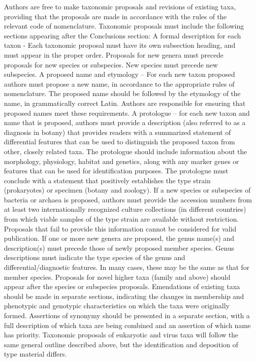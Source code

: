 \documentclass{bmcart}
\begin{document}
Authors are free to make taxonomic proposals and revisions of existing taxa, providing that the proposals are made in accordance with the rules of the relevant code of nomenclature. Taxonomic proposals must include the following sections appearing after the Conclusions section: A formal description for each taxon - Each taxonomic proposal must have its own subsection heading, and must appear in the proper order. Proposals for new genera must precede proposals for new species or subspecies. New species must precede new subspecies. A proposed name and etymology – For each new taxon proposed authors must propose a new name, in accordance to the appropriate rules of nomenclature. The proposed name should be followed by the etymology of the name, in grammatically correct Latin. Authors are responsible for ensuring that proposed names meet these requirements.
A protologue – for each new taxon and name that is proposed, authors must provide a description (also referred to as a diagnosis in botany) that provides readers with a summarized statement of differential features that can be used to distinguish the proposed taxon from other, closely related taxa. The protologue should include information about the morphology, physiology, habitat and genetics, along with any marker genes or features that can be used for identification purposes. The protologue must conclude with a statement that positively establishes the type strain (prokaryotes) or specimen (botany and zoology). If a new species or subspecies of bacteria or archaea is proposed, authors must provide the accession numbers from at least two internationally recognized culture collections (in different countries) from which viable samples of the type strain are available without restriction. Proposals that fail to provide this information cannot be considered for valid publication. If one or more new genera are proposed, the genus name(s) and description(s) must precede those of newly proposed member species. Genus descriptions must indicate the type species of the genus and differential/diagnostic features. In many cases, these may be the same as that for member species. Proposals for novel higher taxa (family and above) should appear after the species or subspecies proposals. Emendations of existing taxa should be made in separate sections, indicating the changes in membership and phenotypic and genotypic characteristics on which the taxa were originally formed. Assertions of synonymy should be presented in a separate section, with a full description of which taxa are being combined and an assertion of which name has priority. Taxonomic proposals of eukaryotic and virus taxa will follow the same general outline described above, but the identification and deposition of type material differs.
\end{document}

